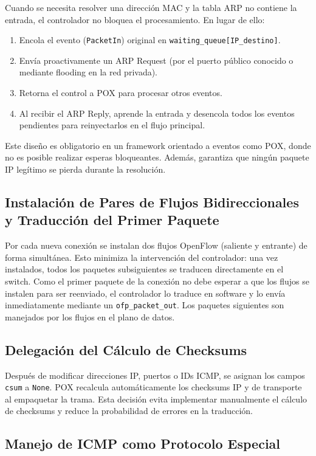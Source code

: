 \documentclass[11pt, a4paper]{article}
\begin{document}
Cuando se necesita resolver una dirección MAC y la tabla ARP no contiene la entrada, el controlador no bloquea el procesamiento. En lugar de ello:
\begin{enumerate}
    \item Encola el evento (\texttt{PacketIn}) original en \texttt{waiting\_queue[IP\_destino]}.
    \item Envía proactivamente un ARP Request (por el puerto público conocido o mediante flooding en la red privada).
    \item Retorna el control a POX para procesar otros eventos.
    \item Al recibir el ARP Reply, aprende la entrada y desencola todos los eventos pendientes para reinyectarlos en el flujo principal.
\end{enumerate}
Este diseño es obligatorio en un framework orientado a eventos como POX, donde no es posible realizar esperas bloqueantes. Además, garantiza que ningún paquete IP legítimo se pierda durante la resolución.

\subsection{Instalación de Pares de Flujos Bidireccionales y Traducción del Primer Paquete}
\label{subsec:flujos_pares}

Por cada nueva conexión se instalan dos flujos OpenFlow (saliente y entrante) de forma simultánea. Esto minimiza la intervención del controlador: una vez instalados, todos los paquetes subsiguientes se traducen directamente en el switch. Como el primer paquete de la conexión no debe esperar a que los flujos se instalen para ser reenviado, el controlador lo traduce en software y lo envía inmediatamente mediante un \texttt{ofp\_packet\_out}. Los paquetes siguientes son manejados por los flujos en el plano de datos.

\subsection{Delegación del Cálculo de Checksums}
\label{subsec:checksums}

Después de modificar direcciones IP, puertos o IDs ICMP, se asignan los campos \texttt{csum} a \texttt{None}. POX recalcula automáticamente los checksums IP y de transporte al empaquetar la trama. Esta decisión evita implementar manualmente el cálculo de checksums y reduce la probabilidad de errores en la traducción.

\subsection{Manejo de ICMP como Protocolo Especial}
\label{subsec:icmp}
\end{document}
